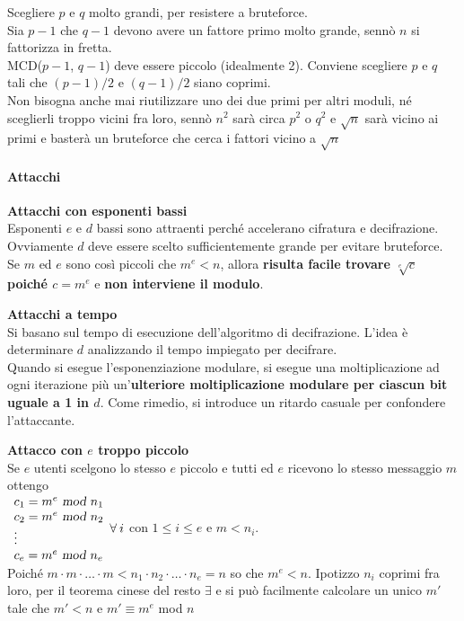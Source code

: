 \documentclass[10pt]{book}
\begin{document}
Scegliere $p$ e $q$ molto grandi, per resistere a bruteforce.\\
Sia $p-1$ che $q-1$ devono avere un fattore primo molto grande, sennò $n$ si fattorizza in fretta.\\
MCD($p-1$, $q-1$) deve essere piccolo (idealmente 2). Conviene scegliere $p$ e $q$ tali che $(p-1)/2$ e $(q-1)/2$ siano coprimi.\\
Non bisogna anche mai riutilizzare uno dei due primi per altri moduli, né sceglierli troppo vicini fra loro, sennò $n^2$ sarà circa $p^2$ o $q^2$ e $\sqrt{n}$ sarà vicino ai primi e basterà un bruteforce che cerca i fattori vicino a $\sqrt{n}$
\paragraph{Attacchi}
\begin{list}{}{}
	\item \textbf{Attacchi con esponenti bassi}\\
	Esponenti $e$ e $d$ bassi sono attraenti perché accelerano cifratura e decifrazione. Ovviamente $d$ deve essere scelto sufficientemente grande per evitare bruteforce.\\
	Se $m$ ed $e$ sono così piccoli che $m^e < n$, allora \textbf{risulta facile trovare $\sqrt[e]{c}$ poiché $c = m^e$} e \textbf{non interviene il modulo}.
	\item \textbf{Attacchi a tempo}\\
	Si basano sul tempo di esecuzione dell'algoritmo di decifrazione. L'idea è determinare $d$ analizzando il tempo impiegato per decifrare.\\
	Quando si esegue l'esponenziazione modulare, si esegue una moltiplicazione ad ogni iterazione più un'\textbf{ulteriore moltiplicazione modulare per ciascun bit uguale a 1 in $d$}. Come rimedio, si introduce un ritardo casuale per confondere l'attaccante.
	\item \textbf{Attacco con $e$ troppo piccolo}\\
	Se $e$ utenti scelgono lo stesso $e$ piccolo e tutti ed $e$ ricevono lo stesso messaggio $m$ ottengo\\$\begin{array}{l}
	c_1 = m^e\textsl{ mod }n_1\\
	c_2 = m^e\textsl{ mod }n_2\\
	\vdots\\
	c_e = m^e\textsl{ mod }n_e
	\end{array} \forall\:i$ con $1\leq i\leq e$ e $m < n_i$.\\Poiché $m\cdot m\cdot\ldots\cdot m < n_1\cdot n_2\cdot\ldots\cdot n_e = n$ so che $m^e < n$. Ipotizzo $n_i$ coprimi fra loro, per il teorema cinese del resto $\exists$ e si può facilmente calcolare un unico $m'$ tale che $m' < n$ e $m'\equiv m^e$ mod $n$\\

\end{list}
\end{document}

